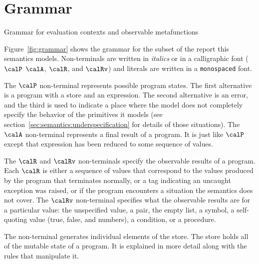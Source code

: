 \section{Grammar}\label{sec:semantics:grammar}

\beginfig
\subfigureadjust{}

\caption{Grammar for evaluation contexts and observable metafunctions}\label{fig:ec-grammar}
\endfig
\subfigurestop{}

Figure~\ref{fig:grammar} shows the grammar for the subset of the
report this semantics models. Non-terminals are written in
\textit{italics} or in a calligraphic font ($\calP$
$\calA$, $\calR$, and $\calRv$) and literals are 
written in a \texttt{monospaced} font.

The $\calP$ non-terminal represents possible program states. The
first alternative is a program with a store and an expression. The second alternative is an error, and the third is
used to indicate a place where the model does not completely specify
the behavior of the primitives it models (see section~\ref{sec:semantics:underspecification} for details of those situations). 
The $\calA$ non-terminal
represents a final result of a program. It is just like $\calP$
except that expression has been reduced to some sequence of values.

The $\calR$ and $\calRv$ non-terminals specify the observable results of a program. Each $\calR$ is either a sequence of values that correspond to the values produced by the program that terminates normally, or a tag indicating an uncaught exception was raised, or  if the program encounters a situation the semantics does not cover. The $\calRv$ non-terminal specifies what the observable results are for a particular value: the unspecified value, a pair, the empty list, a symbol, a self-quoting value (true, false, and numbers), a condition, or a procedure.

The  non-terminal generates individual elements of the
store. The store holds all of the mutable state of a program. It is
explained in more detail along with the rules that manipulate it.


